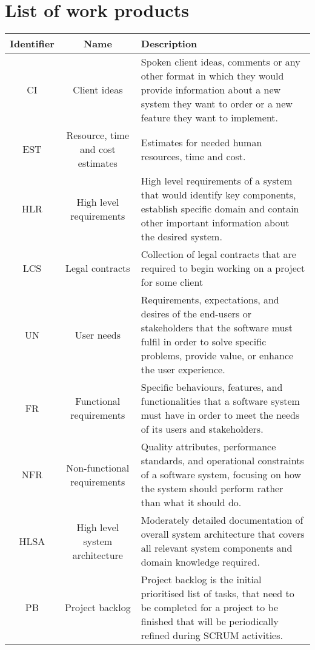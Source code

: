 

\newcommand{\describeWorkProd}[2]{
    \expandafter\def\csname desc#1\endcsname{#1}
}
\newcommand{\workProdDescriptions}{

}

\forlistloop{}{\WorkProdList}

\section{List of work products}

\begin{longtable}{|c|c|p{}|}
\hline
\textbf{Identifier} & \textbf{Name} & \textbf{Description} \\ \hline
CI & Client ideas & Spoken client ideas, comments or any other format in which they would provide information about a new system they want to order or a new feature they want to implement. \\ \hline
EST & Resource, time and cost estimates & Estimates for needed human resources, time and cost. \\ \hline
HLR & High level requirements & High level requirements of a system that would identify key components, establish specific domain and contain other important information about the desired system. \\ \hline
LCS & Legal contracts & Collection of legal contracts that are required to begin working on a project for some client \\ \hline
UN & User needs & Requirements, expectations, and desires of the end-users or stakeholders that the software must fulfil in order to solve specific problems, provide value, or enhance the user experience. \\ \hline
FR & Functional requirements & Specific behaviours, features, and functionalities that a software system must have in order to meet the needs of its users and stakeholders. \\ \hline
NFR & Non-functional requirements & Quality attributes, performance standards, and operational constraints of a software system, focusing on how the system should perform rather than what it should do. \\ \hline
HLSA & High level system architecture & Moderately detailed documentation of overall system architecture that covers all relevant system components and domain knowledge required.  \\ \hline
PB & Project backlog & Project backlog is the initial prioritised list of tasks, that need to be completed for a project to be finished that will be periodically refined during SCRUM activities. \\ \hline

\end{longtable}
